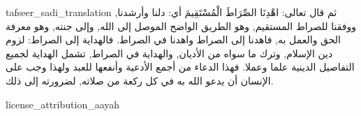 \begin{taggedblock}{tafseer_sadi_translation}
ثم قال تعالى:
{ اهْدِنَا الصِّرَاطَ الْمُسْتَقِيمَ }
أي: دلنا وأرشدنا, ووفقنا للصراط المستقيم, وهو الطريق الواضح الموصل إلى الله, وإلى جنته, وهو معرفة الحق والعمل به, فاهدنا إلى الصراط واهدنا في الصراط. فالهداية إلى الصراط: لزوم دين الإسلام, وترك ما سواه من الأديان, والهداية في الصراط, تشمل الهداية لجميع التفاصيل الدينية علما وعملا. فهذا الدعاء من أجمع الأدعية وأنفعها للعبد ولهذا وجب على الإنسان أن يدعو الله به في كل ركعة من صلاته, لضرورته إلى ذلك.
\end{taggedblock}
\begin{taggedblock}{license_attribution_aayah}

\end{taggedblock}
\begin{comment}
Please use the following for footnotes:- Sample\footnoteQ{Text of Qur'an footnote goes here.}.
Sample\footnoteT{Text of Tafseer footnote goes here.}.
\end{comment}